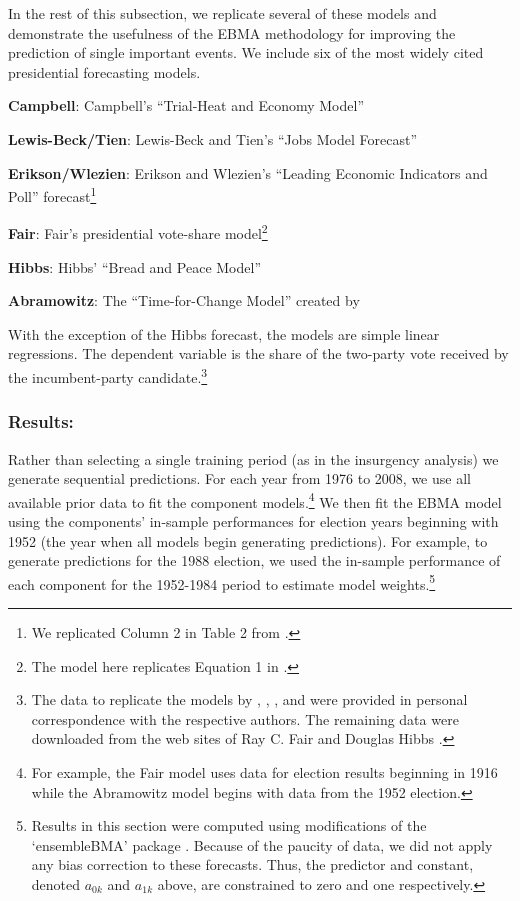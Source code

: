 \documentclass[12pt,fullpage]{article}
\newcommand{\note}[1]{\footnote{\doublespacing#1 \vspace{4 mm}}}
\begin{document}
In the rest of this subsection, we replicate several of these models and
demonstrate the usefulness of the EBMA methodology for improving the
prediction of single important events.  We include six of the most widely cited
presidential forecasting models.
\begin{list}{}{\leftmargin=1em}
\item \textbf{Campbell}: Campbell's ``Trial-Heat and Economy Model''
  \citep{Campbell:2008}
\item \textbf{Lewis-Beck/Tien}: Lewis-Beck and Tien's ``Jobs Model Forecast'' \citep{Lewis-Beck:Tien:2008}
\item \textbf{Erikson/Wlezien}: Erikson and Wlezien's ``Leading Economic Indicators
  and Poll'' forecast\note{We replicated Column 2 in Table 2 from \citet{Erikson:Wlezien:2008}.}
\item \textbf{Fair}: Fair's presidential vote-share model\note{The model here replicates Equation 1 in \citet{Fair:2010}.}
\item \textbf{Hibbs}: Hibbs' ``Bread and Peace Model'' \citep{Hibbs:2000}
\item \textbf{Abramowitz}: The ``Time-for-Change Model'' created by
  \citet{Abramowitz:2008}
\end{list}
\noindent With the exception of the Hibbs forecast, the models are
simple linear regressions. The dependent variable is the share of the
two-party vote received by the incumbent-party candidate.\note{The
  data to replicate the models by \citet{Abramowitz:2008},
  \citet{Campbell:2008}, \citet{Erikson:Wlezien:2008}, and
  \citet{Lewis-Beck:Tien:2008} were provided in personal
  correspondence with the respective authors.  The remaining data were
  downloaded from the web sites of Ray C. Fair \nocite{Fair2011} and
  Douglas Hibbs \nocite{Hibbs2011}.}


\subsubsection{Results:}

Rather than selecting a single training period (as in the insurgency
analysis) we generate sequential predictions.  For each year from 1976
to 2008, we use all available prior data to fit the component
models.\note{For example, the Fair model uses data for election
  results beginning in 1916 while the Abramowitz model begins with
  data from the 1952 election. }  We then fit the EBMA model using the
components' in-sample performances for election years beginning with
1952 (the year when all models begin generating predictions).  For
example, to generate predictions for the 1988 election, we used the
in-sample performance of each component for the 1952-1984 period to
estimate model weights.\note{Results in this section were computed
  using modifications of the `ensembleBMA' package
  \citep{Fraley:2010b, Fraley:Forthcoming}.  Because of the paucity of
  data, we did not apply any bias correction to these forecasts.  Thus,
  the predictor and constant, denoted $a_{0k}$ and $a_{1k}$ above, are
  constrained to zero and one respectively.}
\end{document}
